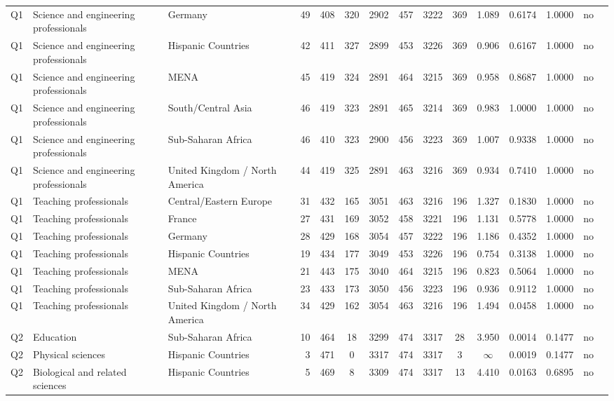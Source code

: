 \begin{longtable}{lllrcccccccccll}
Q1 & Science and engineering professionals & Germany & 49 & 408 & 320 & 2902 & 457 & 3222 & 369 & 1.089 & 0.6174 & 1.0000 & no \\
Q1 & Science and engineering professionals & Hispanic Countries & 42 & 411 & 327 & 2899 & 453 & 3226 & 369 & 0.906 & 0.6167 & 1.0000 & no \\
Q1 & Science and engineering professionals & MENA & 45 & 419 & 324 & 2891 & 464 & 3215 & 369 & 0.958 & 0.8687 & 1.0000 & no \\
Q1 & Science and engineering professionals & South/Central Asia & 46 & 419 & 323 & 2891 & 465 & 3214 & 369 & 0.983 & 1.0000 & 1.0000 & no \\
Q1 & Science and engineering professionals & Sub-Saharan Africa & 46 & 410 & 323 & 2900 & 456 & 3223 & 369 & 1.007 & 0.9338 & 1.0000 & no \\
Q1 & Science and engineering professionals & United Kingdom / North America & 44 & 419 & 325 & 2891 & 463 & 3216 & 369 & 0.934 & 0.7410 & 1.0000 & no \\
Q1 & Teaching professionals & Central/Eastern Europe & 31 & 432 & 165 & 3051 & 463 & 3216 & 196 & 1.327 & 0.1830 & 1.0000 & no \\
Q1 & Teaching professionals & France & 27 & 431 & 169 & 3052 & 458 & 3221 & 196 & 1.131 & 0.5778 & 1.0000 & no \\
Q1 & Teaching professionals & Germany & 28 & 429 & 168 & 3054 & 457 & 3222 & 196 & 1.186 & 0.4352 & 1.0000 & no \\
Q1 & Teaching professionals & Hispanic Countries & 19 & 434 & 177 & 3049 & 453 & 3226 & 196 & 0.754 & 0.3138 & 1.0000 & no \\
Q1 & Teaching professionals & MENA & 21 & 443 & 175 & 3040 & 464 & 3215 & 196 & 0.823 & 0.5064 & 1.0000 & no \\
Q1 & Teaching professionals & Sub-Saharan Africa & 23 & 433 & 173 & 3050 & 456 & 3223 & 196 & 0.936 & 0.9112 & 1.0000 & no \\
Q1 & Teaching professionals & United Kingdom / North America & 34 & 429 & 162 & 3054 & 463 & 3216 & 196 & 1.494 & 0.0458 & 1.0000 & no \\
Q2 & Education & Sub-Saharan Africa & 10 & 464 & 18 & 3299 & 474 & 3317 & 28 & 3.950 & 0.0014 & 0.1477 & no \\
Q2 & Physical sciences & Hispanic Countries & 3 & 471 & 0 & 3317 & 474 & 3317 & 3 & $\infty$ & 0.0019 & 0.1477 & no \\
Q2 & Biological and related sciences & Hispanic Countries & 5 & 469 & 8 & 3309 & 474 & 3317 & 13 & 4.410 & 0.0163 & 0.6895 & no \\

\end{longtable}
